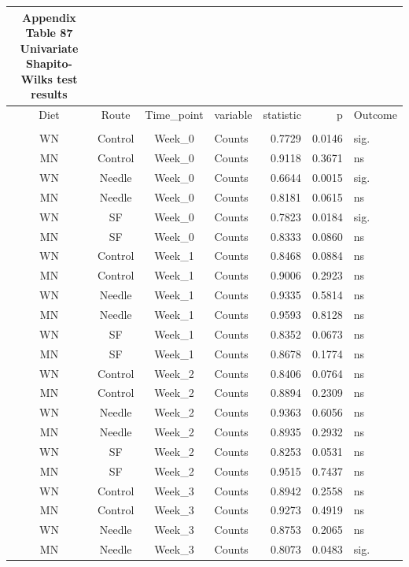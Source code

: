 \documentclass[
  12pt,
  letterpaper,
]{article}
\begin{document}
\begin{longtable}{ccclrrl}
\caption*{
{\large \textbf{Appendix Table 87}} \\ 
{\small \textbf{Univariate Shapito-Wilks test results}}
} \\ 
\toprule
Diet & Route & Time\_point & variable & statistic & p & Outcome \\ 
\midrule\addlinespace[2.5pt]
\multicolumn{7}{l}{Pre-Infection} \\ 
\midrule\addlinespace[2.5pt]
WN & Control & Week\_0 & Counts & 0.7729 & 0.0146 & sig. \\ 
MN & Control & Week\_0 & Counts & 0.9118 & 0.3671 & ns \\ 
WN & Needle & Week\_0 & Counts & 0.6644 & 0.0015 & sig. \\ 
MN & Needle & Week\_0 & Counts & 0.8181 & 0.0615 & ns \\ 
WN & SF & Week\_0 & Counts & 0.7823 & 0.0184 & sig. \\ 
MN & SF & Week\_0 & Counts & 0.8333 & 0.0860 & ns \\ 
WN & Control & Week\_1 & Counts & 0.8468 & 0.0884 & ns \\ 
MN & Control & Week\_1 & Counts & 0.9006 & 0.2923 & ns \\ 
WN & Needle & Week\_1 & Counts & 0.9335 & 0.5814 & ns \\ 
MN & Needle & Week\_1 & Counts & 0.9593 & 0.8128 & ns \\ 
WN & SF & Week\_1 & Counts & 0.8352 & 0.0673 & ns \\ 
MN & SF & Week\_1 & Counts & 0.8678 & 0.1774 & ns \\ 
WN & Control & Week\_2 & Counts & 0.8406 & 0.0764 & ns \\ 
MN & Control & Week\_2 & Counts & 0.8894 & 0.2309 & ns \\ 
WN & Needle & Week\_2 & Counts & 0.9363 & 0.6056 & ns \\ 
MN & Needle & Week\_2 & Counts & 0.8935 & 0.2932 & ns \\ 
WN & SF & Week\_2 & Counts & 0.8253 & 0.0531 & ns \\ 
MN & SF & Week\_2 & Counts & 0.9515 & 0.7437 & ns \\ 
WN & Control & Week\_3 & Counts & 0.8942 & 0.2558 & ns \\ 
MN & Control & Week\_3 & Counts & 0.9273 & 0.4919 & ns \\ 
WN & Needle & Week\_3 & Counts & 0.8753 & 0.2065 & ns \\ 
MN & Needle & Week\_3 & Counts & 0.8073 & 0.0483 & sig. \\ 

\end{longtable}
\end{document}
